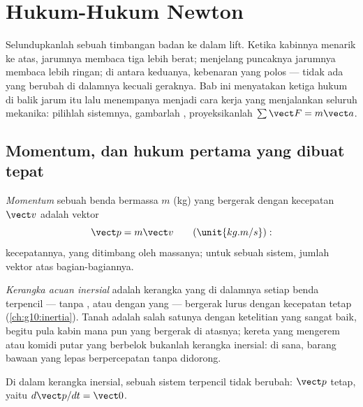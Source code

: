 \chapter{Hukum-Hukum Newton}\label{ch:g12:newtons-laws}

Selundupkanlah sebuah timbangan badan ke dalam lift. Ketika kabinnya menarik ke atas,
jarumnya membaca tiga  lebih berat; menjelang puncaknya jarumnya membaca lebih
ringan; di antara keduanya, kebenaran yang polos --- tidak ada yang berubah di dalamnya
kecuali geraknya. Bab ini menyatakan ketiga hukum di balik jarum itu lalu menempanya
menjadi cara kerja yang menjalankan seluruh mekanika: pilihlah sistemnya, gambarlah
, proyeksikanlah $\sum \vect F = m\vect a$.

\section{Momentum, dan hukum pertama yang dibuat tepat}

\begin{definition}[Momentum]\label{def:g12:newtons-laws:momentum}
\emph{Momentum} sebuah benda bermassa $m$ (\unit{kg}) yang bergerak
dengan kecepatan $\vect v$ adalah vektor
\[
\vect p = m \vect v \qquad (\unit{kg.m/s}):
\]
kecepatannya, yang ditimbang oleh massanya; untuk sebuah sistem, jumlah vektor atas
bagian-bagiannya.
\end{definition}

\begin{definition}\label{def:g12:newtons-laws:inertial}
\emph{Kerangka acuan inersial} adalah kerangka yang di
dalamnya setiap benda terpencil --- tanpa , atau dengan  yang 
--- bergerak lurus dengan kecepatan tetap (\cref{ch:g10:inertia}). Tanah adalah salah
satunya dengan ketelitian yang sangat baik, begitu pula kabin mana pun yang bergerak
 di atasnya; kereta yang mengerem atau komidi putar yang berbelok
bukanlah kerangka inersial: di sana, barang bawaan yang lepas berpercepatan tanpa
didorong.
\end{definition}

\begin{theorem}\label{thm:g12:newtons-laws:first}
Di dalam kerangka inersial,  sebuah sistem terpencil tidak berubah: $\vect p$
tetap, yaitu $d\vect p/dt = \vect 0$.
\end{theorem}
\admitted

